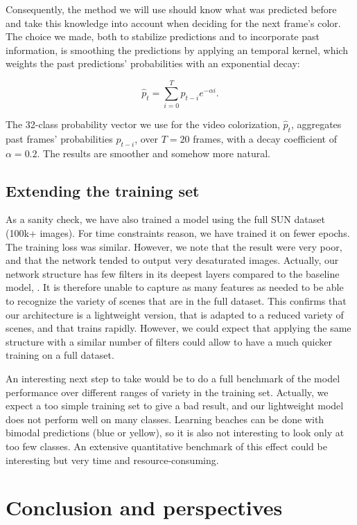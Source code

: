 \documentclass[10pt,twocolumn,letterpaper]{article}
\begin{document}
Consequently, the method we will use should know what was predicted before and take this knowledge into account when deciding for the next frame's color. The choice we made, both to stabilize predictions and to incorporate past information, is smoothing the predictions by applying an temporal kernel, which weights the past predictions' probabilities with an exponential decay:

 $$\hat p_t = \sum_{i = 0}^T p_{t-i} e^{-\alpha i}.$$

 The 32-class probability vector we use for the video colorization, $\hat p_t$, aggregates past frames' probabilities $p_{t-i}$, over $T=20$ frames, with a decay coefficient of $\alpha=0.2$. The results are smoother and somehow more natural.

\subsection{Extending the training set}

As a sanity check, we have also trained a model using the full SUN dataset (100k+ images). For time constraints reason, we have trained it on fewer epochs. The training loss was similar. However, we note that the result were very poor, and that the network tended to output very desaturated images. Actually, our network structure has few filters in its deepest layers compared to the baseline model, \cite{zhang2016colorful}. It is therefore unable to capture as many features as needed to be able to recognize the variety of scenes that are in the full dataset. This confirms that our architecture is a lightweight version, that is adapted to a reduced variety of scenes, and that trains rapidly. However, we could expect that applying the same structure with a similar number of filters could allow to have a much quicker training on a full dataset.

An interesting next step to take would be to do a full benchmark of the model performance over different ranges of variety in the training set. Actually, we expect a too simple training set to give a bad result, and our lightweight model does not perform well on many classes. Learning beaches can be done with bimodal predictions (blue or yellow), so it is also not interesting to look only at too few classes. An extensive quantitative benchmark of this effect could be interesting but very time and resource-consuming.

\section{Conclusion and perspectives}
\end{document}
